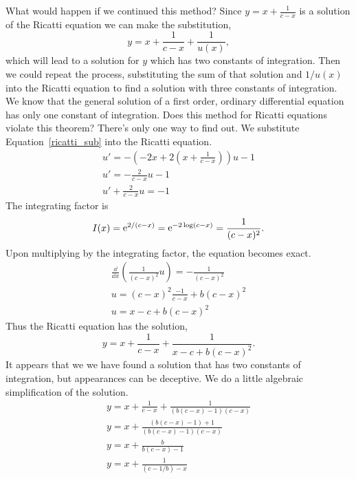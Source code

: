 {\begin{Solution}
\begin{enumerate}
    What would happen if we continued this method?  Since $y = x + \frac{1}{c-x}$
    is a solution of the Ricatti equation we can make the substitution,
    \begin{equation}
      \label{ricatti_sub}
      y = x + \frac{1}{c-x} + \frac{1}{u(x)},
    \end{equation}
    which will lead to a solution for $y$ which has two constants of integration.
    Then we could repeat the process, substituting the sum of that solution and 
    $1/u(x)$ into the Ricatti equation to find a solution with three constants
    of integration.  We know that the general solution of a first order,
    ordinary differential equation has only one constant of integration.  
    Does this method for Ricatti equations violate this theorem?  There's only
    one way to find out.  We substitute Equation~\ref{ricatti_sub} into the 
    Ricatti equation.
    \begin{gather*}
      u' = - \left( - 2 x + 2 \left( x + \frac{1}{c - x} \right) \right) u - 1 \\
      u' = - \frac{2}{c - x} u - 1 \\
      u' + \frac{2}{c - x} u = - 1 
    \end{gather*}
    The integrating factor is 
    \[
    I(x) = \mathop{\mathrm{e}}\nolimits^{2/(c-x)} = \mathop{\mathrm{e}}\nolimits^{-2 \log (c-x)}
    = \frac{1}{(c-x)^2}.
    \]
    Upon multiplying by the integrating factor, the equation becomes exact.
    \begin{gather*}
      \frac{\dd}{\dd x} \left( \frac{1}{(c-x)^2} u \right) = - \frac{1}{(c-x)^2} \\
      u = (c-x)^2 \frac{-1}{c-x} + b (c-x)^2 \\
      u = x - c + b (c-x)^2
    \end{gather*}
    Thus the Ricatti equation has the solution,
    \[
    y = x + \frac{1}{c-x} + \frac{1}{x - c + b(c-x)^2}.
    \]
    It appears that we we have found a solution that has two constants of 
    integration, but appearances can be deceptive.  We do a little 
    algebraic simplification of the solution.
    \begin{gather*}
      y = x + \frac{1}{c-x} + \frac{1}{(b(c-x) - 1)(c-x)} \\
      y = x + \frac{(b(c-x) - 1) + 1}{(b(c-x) - 1)(c-x)} \\
      y = x + \frac{b}{b(c-x) - 1} \\
      y = x + \frac{1}{(c-1/b) - x} \\
    \end{gather*}

\end{enumerate}
\end{Solution}}

